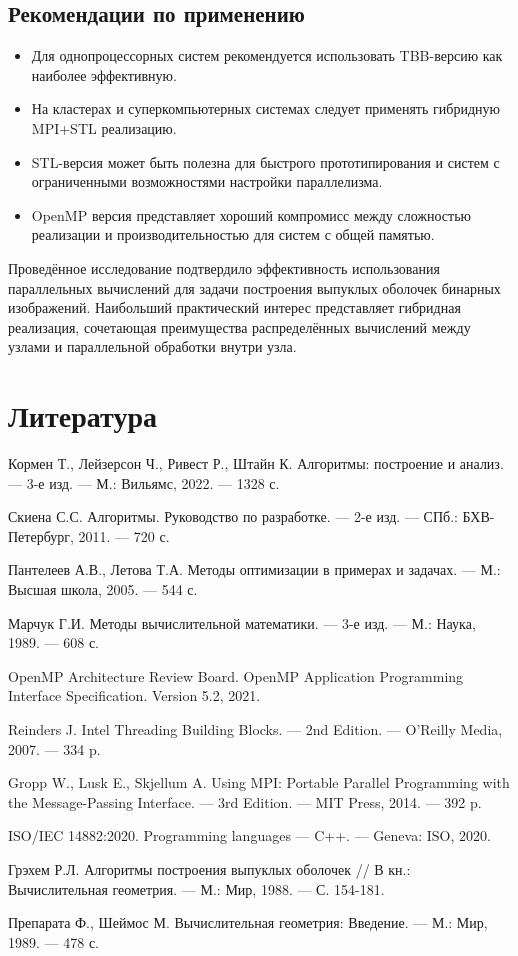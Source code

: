 \documentclass[12pt]{article}
\begin{document}
\subsection{Рекомендации по применению}
\begin{itemize}
    \item Для однопроцессорных систем рекомендуется использовать TBB-версию как наиболее эффективную.
    
    \item На кластерах и суперкомпьютерных системах следует применять гибридную MPI+STL реализацию.
    
    \item STL-версия может быть полезна для быстрого прототипирования и систем с ограниченными возможностями настройки параллелизма.
    
    \item OpenMP версия представляет хороший компромисс между сложностью реализации и производительностью для систем с общей памятью.
\end{itemize}

Проведённое исследование подтвердило эффективность использования параллельных вычислений для задачи построения выпуклых оболочек бинарных изображений. Наибольший практический интерес представляет гибридная реализация, сочетающая преимущества распределённых вычислений между узлами и параллельной обработки внутри узла.

\newpage
\section{Литература}

\begin{thebibliography}{9}
\bibitem{} 
Кормен Т., Лейзерсон Ч., Ривест Р., Штайн К. Алгоритмы: построение и анализ. — 3-е изд. — М.: Вильямс, 2022. — 1328 с.

\bibitem{} 
Скиена С.С. Алгоритмы. Руководство по разработке. — 2-е изд. — СПб.: БХВ-Петербург, 2011. — 720 с.

\bibitem{} 
Пантелеев А.В., Летова Т.А. Методы оптимизации в примерах и задачах. — М.: Высшая школа, 2005. — 544 с.

\bibitem{} 
Марчук Г.И. Методы вычислительной математики. — 3-е изд. — М.: Наука, 1989. — 608 с.

\bibitem{} 
OpenMP Architecture Review Board. OpenMP Application Programming Interface Specification. Version 5.2, 2021.

\bibitem{} 
Reinders J. Intel Threading Building Blocks. — 2nd Edition. — O'Reilly Media, 2007. — 334 p.

\bibitem{} 
Gropp W., Lusk E., Skjellum A. Using MPI: Portable Parallel Programming with the Message-Passing Interface. — 3rd Edition. — MIT Press, 2014. — 392 p.

\bibitem{} 
ISO/IEC 14882:2020. Programming languages — C++. — Geneva: ISO, 2020.

\bibitem{} 
Грэхем Р.Л. Алгоритмы построения выпуклых оболочек // В кн.: Вычислительная геометрия. — М.: Мир, 1988. — С. 154-181.

\bibitem{} 
Препарата Ф., Шеймос М. Вычислительная геометрия: Введение. — М.: Мир, 1989. — 478 с.
\end{thebibliography}
\end{document}
